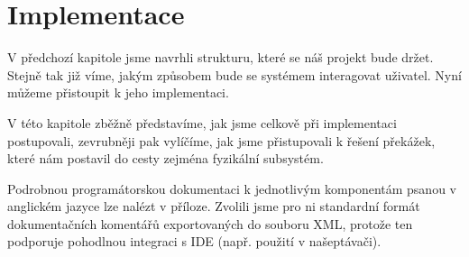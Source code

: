 \chapter{Implementace}

V předchozí kapitole jsme navrhli strukturu, které se náš projekt bude držet. Stejně tak již víme, jakým způsobem bude se systémem interagovat uživatel. Nyní můžeme přistoupit k jeho implementaci.

V této kapitole zběžně představíme, jak jsme celkově při implementaci postupovali, zevrubněji pak vylíčíme, jak jsme přistupovali k řešení překážek, které nám postavil do cesty zejména fyzikální subsystém. 

Podrobnou programátorskou dokumentaci k jednotlivým komponentám psanou v anglickém jazyce lze nalézt v příloze. Zvolili jsme pro ni standardní formát dokumentačních komentářů exportovaných do souboru XML, protože ten podporuje pohodlnou integraci s IDE (např. použití v našeptávači).

